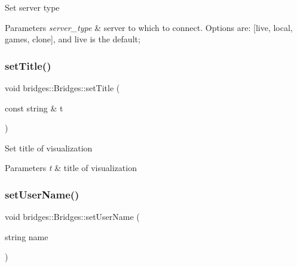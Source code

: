 Set server type


\begin{DoxyParams}{Parameters}
{\em server\+\_\+type} & server to which to connect. Options are\+: \mbox{[}\textquotesingle{}live\textquotesingle{}, \textquotesingle{}local\textquotesingle{}, \textquotesingle{}games\textquotesingle{}, \textquotesingle{}clone\textquotesingle{}\mbox{]}, and \textquotesingle{}live\textquotesingle{} is the default; \\
\hline
\end{DoxyParams}
\mbox{\label{classbridges_1_1_bridges_ac9f2e0b5fd5c70053db233dcbb636b56}} 
\subsubsection{\texorpdfstring{set\+Title()}{setTitle()}}
{\footnotesize\ttfamily void bridges\+::\+Bridges\+::set\+Title (\begin{DoxyParamCaption}\item[{const string \&}]{t }\end{DoxyParamCaption})\hspace{0.3cm}{\ttfamily [inline]}}

Set title of visualization


\begin{DoxyParams}{Parameters}
{\em t} & title of visualization \\
\hline
\end{DoxyParams}
\mbox{\label{classbridges_1_1_bridges_a383c5c1d3c85541f466e0cb60dde1c29}} 
\subsubsection{\texorpdfstring{set\+User\+Name()}{setUserName()}}
{\footnotesize\ttfamily void bridges\+::\+Bridges\+::set\+User\+Name (\begin{DoxyParamCaption}\item[{string}]{name }\end{DoxyParamCaption})\hspace{0.3cm}{\ttfamily [inline]}}



